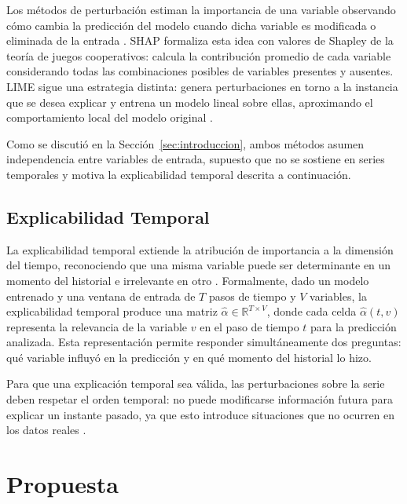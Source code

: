 \documentclass[conference, letterpaper]{IEEEtran}
\begin{document}
Los métodos de perturbación estiman la importancia de una variable observando cómo cambia la predicción del modelo cuando dicha variable es modificada o eliminada de la entrada \cite{arsenault2025}. SHAP formaliza esta idea con valores de Shapley de la teoría de juegos cooperativos: calcula la contribución promedio de cada variable considerando todas las combinaciones posibles de variables presentes y ausentes. LIME sigue una estrategia distinta: genera perturbaciones en torno a la instancia que se desea explicar y entrena un modelo lineal sobre ellas, aproximando el comportamiento local del modelo original \cite{arsenault2025}.


Como se discutió en la Sección~\ref{sec:introduccion}, ambos métodos asumen independencia entre variables de entrada, supuesto que no se sostiene en series temporales y motiva la explicabilidad temporal descrita a continuación.


\subsection{Explicabilidad Temporal}
La explicabilidad temporal extiende la atribución de importancia 
a la dimensión del tiempo, reconociendo que una misma variable 
puede ser determinante en un momento del historial e irrelevante 
en otro \cite{tonekaboni2020}. Formalmente, dado un modelo 
entrenado y una ventana de entrada de $T$ pasos de tiempo y $V$ 
variables, la explicabilidad temporal produce una matriz 
$\hat{\alpha} \in \mathbb{R}^{T \times V}$, donde cada celda 
$\hat{\alpha}(t, v)$ representa la relevancia de la variable $v$ 
en el paso de tiempo $t$ para la predicción analizada. Esta 
representación permite responder simultáneamente dos preguntas: 
qué variable influyó en la predicción y en qué momento del 
historial lo hizo.


Para que una explicación temporal sea válida, las perturbaciones sobre la serie deben respetar el orden temporal: no puede modificarse información futura para explicar un instante pasado, ya que esto introduce situaciones que no ocurren en los datos reales \cite{tonekaboni2020, crabbe2021}.

\section{Propuesta}
\label{sec:propuesta}
\end{document}

